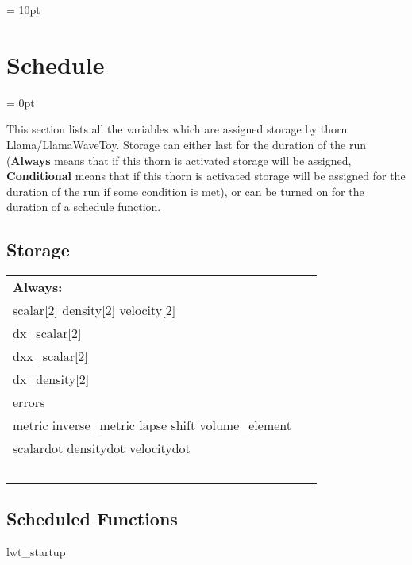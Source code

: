 \documentclass{article}
\begin{document}
\vspace{5mm}\parskip = 10pt 

\section{Schedule} 


\parskip = 0pt


\noindent This section lists all the variables which are assigned storage by thorn Llama/LlamaWaveToy.  Storage can either last for the duration of the run ({\bf Always} means that if this thorn is activated storage will be assigned, {\bf Conditional} means that if this thorn is activated storage will be assigned for the duration of the run if some condition is met), or can be turned on for the duration of a schedule function.


\subsection*{Storage}

\hspace{5mm}

 \begin{tabular*}{160mm}{ll} 

{\bf Always:}&  ~ \\ 
 scalar[2] density[2] velocity[2] & ~\\ 
 dx\_scalar[2] & ~\\ 
 dxx\_scalar[2] & ~\\ 
 dx\_density[2] & ~\\ 
 errors & ~\\ 
 metric inverse\_metric lapse shift volume\_element & ~\\ 
 scalardot densitydot velocitydot & ~\\ 
~ & ~\\ 
\end{tabular*} 


\subsection*{Scheduled Functions}
\vspace{5mm}


\hspace{5mm} lwt\_startup 

\hspace{5mm}{\it register banner with cactus } 
\end{document}
